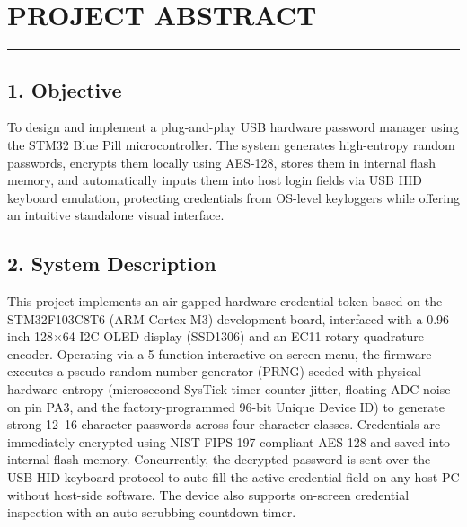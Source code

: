 \documentclass[12pt,a4paper]{article}
\begin{document}

\newpage


\pagestyle{fancy}
\setcounter{page}{1}

\vspace*{-0.3cm}

\section*{\centering PROJECT ABSTRACT}
\rule{\textwidth}{0.8pt}

\vspace{0.3cm}

\subsection*{1. Objective}
To design and implement a plug-and-play USB hardware password manager using the STM32 Blue Pill microcontroller. The system generates high-entropy random passwords, encrypts them locally using AES-128, stores them in internal flash memory, and automatically inputs them into host login fields via USB HID keyboard emulation, protecting credentials from OS-level keyloggers while offering an intuitive standalone visual interface.

\vspace{0.3cm}

\subsection*{2. System Description}
This project implements an air-gapped hardware credential token based on the STM32F103C8T6 (ARM Cortex-M3) development board, interfaced with a 0.96-inch 128$\times$64 I2C OLED display (SSD1306) and an EC11 rotary quadrature encoder. Operating via a 5-function interactive on-screen menu, the firmware executes a pseudo-random number generator (PRNG) seeded with physical hardware entropy (microsecond SysTick timer counter jitter, floating ADC noise on pin PA3, and the factory-programmed 96-bit Unique Device ID) to generate strong 12--16 character passwords across four character classes. Credentials are immediately encrypted using NIST FIPS 197 compliant AES-128 and saved into internal flash memory. Concurrently, the decrypted password is sent over the USB HID keyboard protocol to auto-fill the active credential field on any host PC without host-side software. The device also supports on-screen credential inspection with an auto-scrubbing countdown timer.
\end{document}
